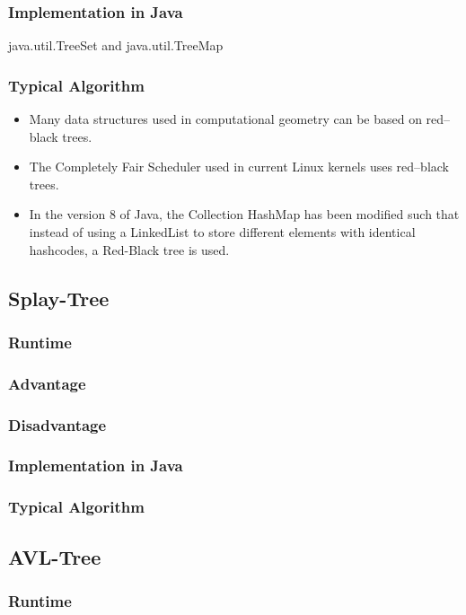 \documentclass[12pt,a4paper]{article}
\newcommand{\RuntimeHead}{Runtime}
\newcommand{\AdvantageHead}{Advantage}
\newcommand{\DisadvantageHead}{Disadvantage}
\newcommand{\ImplementationInJavaHead}{Implementation in Java}
\newcommand{\TypicalAlgorithmHead}{Typical Algorithm}
\begin{document}
\subsubsection{\ImplementationInJavaHead}
java.util.TreeSet and java.util.TreeMap
\subsubsection{\TypicalAlgorithmHead}
\begin{itemize}
\item Many data structures used in computational geometry can be based on red–black trees.
\item The Completely Fair Scheduler used in current Linux kernels uses red–black trees.
\item In the version 8 of Java, the Collection HashMap has been modified such that instead of using a LinkedList to store different elements with identical hashcodes, a Red-Black tree is used.
\end{itemize}
\subsection{Splay-Tree}
\subsubsection{\RuntimeHead}
\subsubsection{\AdvantageHead}
\subsubsection{\DisadvantageHead}
\subsubsection{\ImplementationInJavaHead}
\subsubsection{\TypicalAlgorithmHead}

\subsection{AVL-Tree}
\subsubsection{\RuntimeHead}
\end{document}

